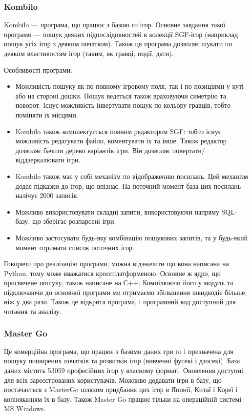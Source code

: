 \subsubsection{Kombilo}
Kombilo --- програма, що працює з базою го ігор. Основне завдання такої програми --- пошук деяких підпослідовностей в колекції SGF-ігор (наприклад пошук усіх ігор з деяким початком). Також ця програма дозволяє шукати по деяким властивостям ігор (таким, як гравці, події, дати).

Особливості програми:
\begin{itemize}
	\item Можливість пошуку як по повному ігровому поля, так і по позиціями у куті або на стороні дошки. Пошук ведеться також враховуючи симетрію та поворот. Існує можливість інвертувати пошук по кольору гравців, тобто поміняти їх місцями.
	\item Kombilo також комплектується повним редактором SGF: тобто існує можливість редагувати файли, коментувати їх та інше. Також редактор дозволяє бачити дерево варіантів ігри. Він дозволяє повертати/віддзеркалювати ігри.
	\item Kombilo також має у собі механізм по відображенню посилань. Цей механізм додає підказки до ігор, що впізнає. На поточний момент база цих посилань налічує 2000 записів.
	\item Можливо використовувати складні запити, використовуючи напряму SQL-базу, що зберігає розпарсені ігри.
	\item Можливо застосувати будь-яку комбінацію пошукових запитів, та у будь-який момент отримати список поточних ігор.
\end{itemize}

Говорячи про реалізацію програми, можна відзначити що вона написана на Python, тому може вважатися кроссплатформеною. Основне ж ядро, що присвячене пошуку, також написане на С++. Компілюючи його у модуль та підключаючи до основної програми ми отримаємо збільшення швидкодіє більше, ніж у два рази. Також це відкрита програма, і програмний код доступний для читання та аналізу.
\subsubsection{Master Go}
Це комерційна програма, що працює з базими даних гри го і призначена для пошуку поширених початків та розвитків ігор (вивченні фусекі і дзосекі). База даних містить 53059 професійних ігор у власному форматі. Оновлення доступні для всіх зареєстрованих користувачів.  Можливо додавати ігри в базу, що постачається з MasterGo шляхом придбання цих ігор в Японії, Китаї і Кореї і копіюванням їх в базу. Також Master Go працює тільки на операційній системі MS Windows.

